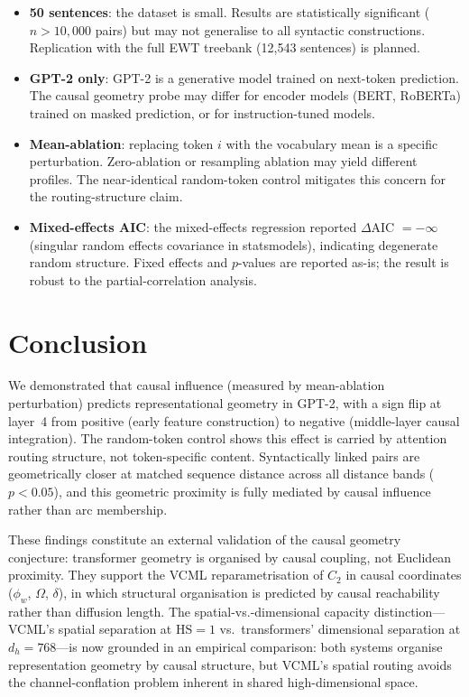 \documentclass[11pt,a4paper]{article}
\begin{document}
\begin{itemize}
\item \textbf{50 sentences}: the dataset is small. Results are statistically
  significant ($n > 10{,}000$ pairs) but may not generalise to all syntactic
  constructions. Replication with the full EWT treebank (12,543 sentences)
  is planned.

\item \textbf{GPT-2 only}: GPT-2 is a generative model trained on next-token
  prediction. The causal geometry probe may differ for encoder models
  (BERT, RoBERTa) trained on masked prediction, or for instruction-tuned models.

\item \textbf{Mean-ablation}: replacing token $i$ with the vocabulary mean is a
  specific perturbation. Zero-ablation or resampling ablation
  \cite{zhang2022resampling} may yield different profiles.
  The near-identical random-token control mitigates this concern for the
  routing-structure claim.

\item \textbf{Mixed-effects AIC}: the mixed-effects regression reported $\Delta$AIC $= -\infty$
  (singular random effects covariance in statsmodels), indicating degenerate random structure.
  Fixed effects and $p$-values are reported as-is; the result is robust to the
  partial-correlation analysis.
\end{itemize}

\section{Conclusion}

We demonstrated that causal influence (measured by mean-ablation perturbation)
predicts representational geometry in GPT-2, with a sign flip at layer~4 from
positive (early feature construction) to negative (middle-layer causal integration).
The random-token control shows this effect is carried by attention routing structure,
not token-specific content.
Syntactically linked pairs are geometrically closer at matched sequence distance
across all distance bands ($p < 0.05$), and this geometric proximity is fully
mediated by causal influence rather than arc membership.

These findings constitute an external validation of the causal geometry conjecture:
transformer geometry is organised by causal coupling, not Euclidean proximity.
They support the VCML reparametrisation of $C_2$ in causal coordinates
($\phi_w$, $\Omega$, $\delta$), in which structural organisation is predicted
by causal reachability rather than diffusion length.
The spatial-vs.-dimensional capacity distinction---VCML's spatial separation
at HS$=1$ vs.\ transformers' dimensional separation at $d_h = 768$---is
now grounded in an empirical comparison: both systems organise representation
geometry by causal structure, but VCML's spatial routing avoids the
channel-conflation problem inherent in shared high-dimensional space.
\end{document}
